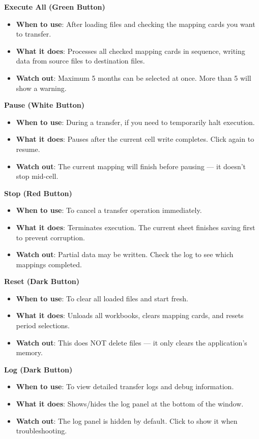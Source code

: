 \documentclass[11pt,a4paper]{article}
\begin{document}
\begin{stepbox}
\textbf{Execute All (Green Button)}
\begin{itemize}[leftmargin=*, itemsep=2pt]
\item \textbf{When to use}: After loading files and checking the mapping cards you want to transfer.
\item \textbf{What it does}: Processes all checked mapping cards in sequence, writing data from source files to destination files.
\item \textbf{Watch out}: Maximum 5 months can be selected at once. More than 5 will show a warning.
\end{itemize}

\textbf{Pause (White Button)}
\begin{itemize}[leftmargin=*, itemsep=2pt]
\item \textbf{When to use}: During a transfer, if you need to temporarily halt execution.
\item \textbf{What it does}: Pauses after the current cell write completes. Click again to resume.
\item \textbf{Watch out}: The current mapping will finish before pausing --- it doesn't stop mid-cell.
\end{itemize}

\textbf{Stop (Red Button)}
\begin{itemize}[leftmargin=*, itemsep=2pt]
\item \textbf{When to use}: To cancel a transfer operation immediately.
\item \textbf{What it does}: Terminates execution. The current sheet finishes saving first to prevent corruption.
\item \textbf{Watch out}: Partial data may be written. Check the log to see which mappings completed.
\end{itemize}

\textbf{Reset (Dark Button)}
\begin{itemize}[leftmargin=*, itemsep=2pt]
\item \textbf{When to use}: To clear all loaded files and start fresh.
\item \textbf{What it does}: Unloads all workbooks, clears mapping cards, and resets period selections.
\item \textbf{Watch out}: This does NOT delete files --- it only clears the application's memory.
\end{itemize}

\textbf{Log (Dark Button)}
\begin{itemize}[leftmargin=*, itemsep=2pt]
\item \textbf{When to use}: To view detailed transfer logs and debug information.
\item \textbf{What it does}: Shows/hides the log panel at the bottom of the window.
\item \textbf{Watch out}: The log panel is hidden by default. Click to show it when troubleshooting.
\end{itemize}
\end{stepbox}
\end{document}

